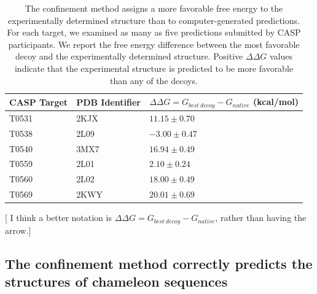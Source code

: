 \documentclass[12pt]{article}
\newcommand{\Ken}[1]{\color{red}#1\normalcolor}
\begin{document}
\begin{table}
\begin{center}
\caption{The confinement method assigns a more favorable free energy to the experimentally
    determined structure than to computer-generated predictions. For each target, we examined as
    many as five predictions submitted by CASP participants. We report the free energy difference
    between the most favorable decoy and the experimentally determined structure. Positive
    $\Delta\Delta G$ values indicate that the experimental structure is predicted to be more
favorable than any of the decoys.}
\label{table:casp_control}
\begin{tabular}{l l l}\hline
    CASP Target  & PDB Identifier & $\Delta \Delta G = G_{best~decoy} - G_{native}$ (kcal/mol) \\ \hline
     T0531       &    2KJX        &          $11.15 \pm 0.70$ \\ \hline
     T0538       &    2L09        &          $-3.00 \pm 0.47$ \\ \hline
     T0540       &    3MX7        &          $16.94 \pm 0.49$ \\ \hline
     T0559       &    2L01        &          $2.10 \pm 0.24$ \\ \hline
     T0560       &    2L02        &          $18.00 \pm 0.49$ \\ \hline
     T0569       &    2KWY        &          $20.01 \pm 0.69$  \\ \hline
\end{tabular}
\end{center}
\end{table}

\Ken{[ I think a better notation is $\Delta \Delta G = G_{best~decoy} - G_{native}$, rather than having the arrow.]}

\subsection{The confinement method correctly predicts the structures of chameleon sequences}
\end{document}
